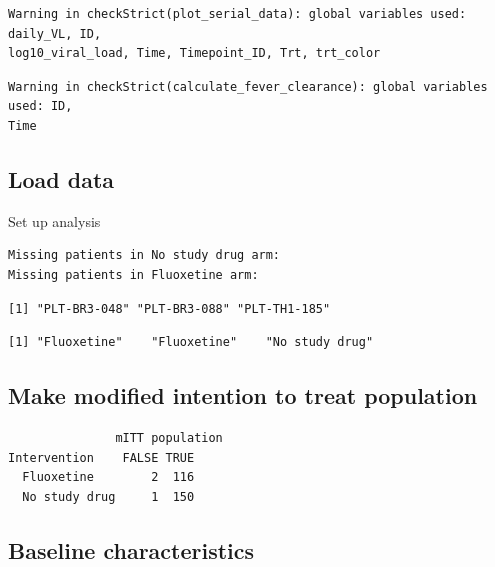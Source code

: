 \documentclass[
  letterpaper,
  DIV=11,
  numbers=noendperiod]{scrartcl}
\begin{document}
\begin{verbatim}
Warning in checkStrict(plot_serial_data): global variables used: daily_VL, ID,
log10_viral_load, Time, Timepoint_ID, Trt, trt_color
\end{verbatim}

\begin{verbatim}
Warning in checkStrict(calculate_fever_clearance): global variables used: ID,
Time
\end{verbatim}

\hypertarget{load-data}{%
\subsection{Load data}\label{load-data}}

Set up analysis

\begin{verbatim}
Missing patients in No study drug arm:
Missing patients in Fluoxetine arm:
\end{verbatim}

\begin{verbatim}
[1] "PLT-BR3-048" "PLT-BR3-088" "PLT-TH1-185"
\end{verbatim}

\begin{verbatim}
[1] "Fluoxetine"    "Fluoxetine"    "No study drug"
\end{verbatim}

\hypertarget{make-modified-intention-to-treat-population}{%
\subsection{Make modified intention to treat
population}\label{make-modified-intention-to-treat-population}}

\begin{verbatim}
               mITT population
Intervention    FALSE TRUE
  Fluoxetine        2  116
  No study drug     1  150
\end{verbatim}

\hypertarget{baseline-characteristics}{%
\subsection{Baseline characteristics}\label{baseline-characteristics}}
\end{document}
